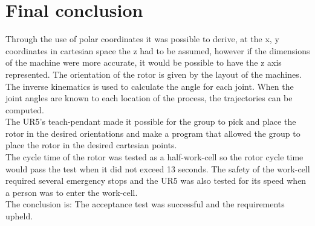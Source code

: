 \chapter{Final conclusion} \label{ch:finalconclusion}

Through the use of polar coordinates it was possible to derive, at the x, y coordinates in cartesian space the z had to be assumed, however if the dimensions of the machine were more accurate, it would be possible to have the z axis represented. The orientation of the rotor is given by the layout of the machines. The inverse kinematics is used to calculate the angle for each joint. When the joint angles are known to each location of the process, the trajectories can be computed.\\
The UR5's teach-pendant made it possible for the group to pick and place the rotor in the desired orientations and make a program that allowed the group to place the rotor in the desired cartesian points.\\
The cycle time of the rotor was tested as a half-work-cell so the rotor cycle time would pass the test when it did not exceed 13 seconds. The safety of the work-cell required several emergency stops and the UR5 was also tested for its speed when a person was to enter the work-cell.\\
The conclusion is: The acceptance test was successful and the requirements upheld.